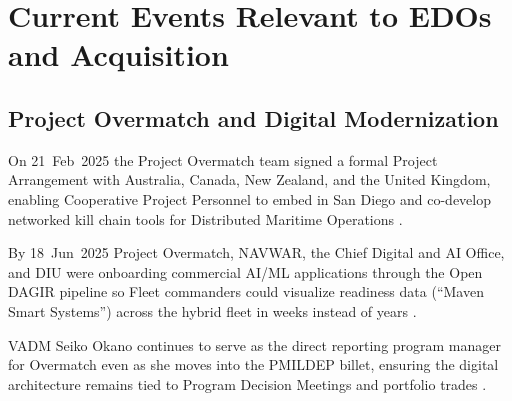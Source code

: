 \documentclass[../main.tex]{subfiles}
\begin{document}

\section{Current Events Relevant to EDOs and Acquisition}
\minibib

\subsection{Project Overmatch and Digital Modernization}
\begin{description}[style=nextline,labelsep=0.5em,font=\bfseries]
  \item[\textbf{Five Eyes Project Arrangement.}] On 21~Feb~2025 the Project Overmatch team signed a formal Project Arrangement with Australia, Canada, New Zealand, and the United Kingdom, enabling Cooperative Project Personnel to embed in San Diego and co-develop networked kill chain tools for Distributed Maritime Operations \autocite{DVIDS-Overmatch-FVEY-2025}.
  \item[\textbf{Open DAGIR pilot.}] By 18~Jun~2025 Project Overmatch, NAVWAR, the Chief Digital and AI Office, and DIU were onboarding commercial AI/ML applications through the Open DAGIR pipeline so Fleet commanders could visualize readiness data (``Maven Smart Systems'') across the hybrid fleet in weeks instead of years \autocite{DVIDS-Overmatch-OpenDAGIR-2025}.
  \item[\textbf{Leadership signal.}] VADM Seiko Okano continues to serve as the direct reporting program manager for Overmatch even as she moves into the PMILDEP billet, ensuring the digital architecture remains tied to Program Decision Meetings and portfolio trades \autocite{DVIDS-Overmatch-OpenDAGIR-2025,SECNAV5000-2G}.
\end{description}
\end{document}
